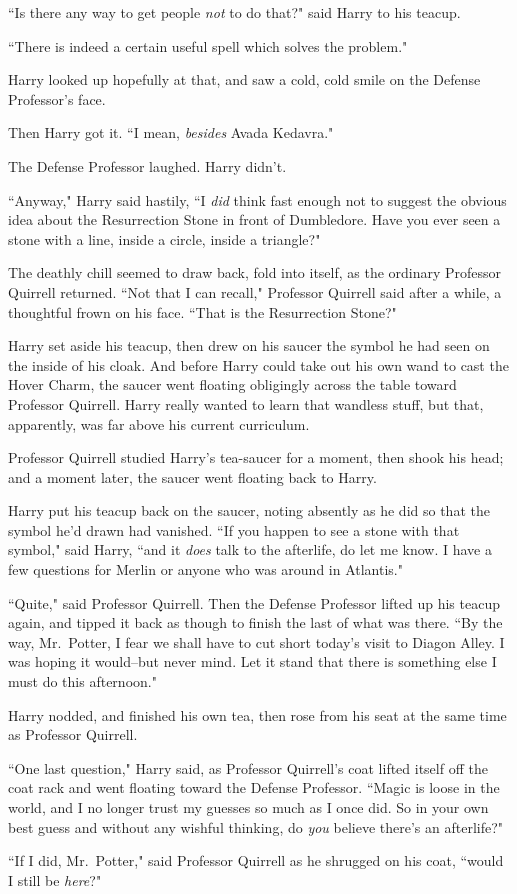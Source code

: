 ``Is there any way to get people \emph{not} to do that?" said Harry to his teacup.

``There is indeed a certain useful spell which solves the problem."

Harry looked up hopefully at that, and saw a cold, cold smile on the Defense Professor's face.

Then Harry got it. ``I mean, \emph{besides} Avada Kedavra."

The Defense Professor laughed. Harry didn't.

``Anyway," Harry said hastily, ``I \emph{did} think fast enough not to suggest the obvious idea about the Resurrection Stone in front of Dumbledore. Have you ever seen a stone with a line, inside a circle, inside a triangle?"

The deathly chill seemed to draw back, fold into itself, as the ordinary Professor Quirrell returned. ``Not that I can recall," Professor Quirrell said after a while, a thoughtful frown on his face. ``That is the Resurrection Stone?"

Harry set aside his teacup, then drew on his saucer the symbol he had seen on the inside of his cloak. And before Harry could take out his own wand to cast the Hover Charm, the saucer went floating obligingly across the table toward Professor Quirrell. Harry really wanted to learn that wandless stuff, but that, apparently, was far above his current curriculum.

Professor Quirrell studied Harry's tea-saucer for a moment, then shook his head; and a moment later, the saucer went floating back to Harry.

Harry put his teacup back on the saucer, noting absently as he did so that the symbol he'd drawn had vanished. ``If you happen to see a stone with that symbol," said Harry, ``and it \emph{does} talk to the afterlife, do let me know. I have a few questions for Merlin or anyone who was around in Atlantis."

``Quite," said Professor Quirrell. Then the Defense Professor lifted up his teacup again, and tipped it back as though to finish the last of what was there. ``By the way, Mr.~Potter, I fear we shall have to cut short today's visit to Diagon Alley. I was hoping it would\---but never mind. Let it stand that there is something else I must do this afternoon."

Harry nodded, and finished his own tea, then rose from his seat at the same time as Professor Quirrell.

``One last question," Harry said, as Professor Quirrell's coat lifted itself off the coat rack and went floating toward the Defense Professor. ``Magic is loose in the world, and I no longer trust my guesses so much as I once did. So in your own best guess and without any wishful thinking, do \emph{you} believe there's an afterlife?"

``If I did, Mr.~Potter," said Professor Quirrell as he shrugged on his coat, ``would I still be \emph{here}?"

